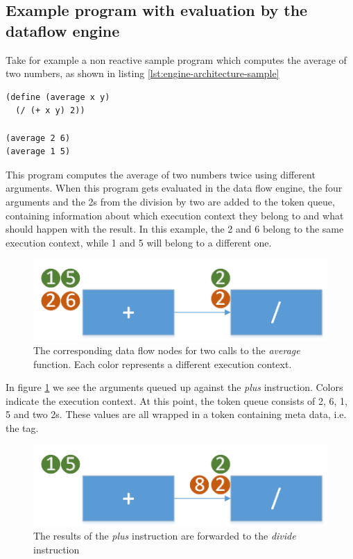 \subsection{Example program with evaluation by the dataflow engine}

Take for example a non reactive sample program which computes the average of two numbers, as shown in listing \ref{lst:engine-architecture-sample}

\begin{lstlisting}[caption={Computing the average of two numbers},captionpos=b,label={lst:engine-architecture-sample},language=FrDataFlow]
(define (average x y)
  (/ (+ x y) 2))
  
(average 2 6)
(average 1 5)
\end{lstlisting}

This program computes the average of two numbers twice using different arguments. When this program gets evaluated in the data flow engine, the four arguments and the 2s from the division by two are added to the token queue, containing information about which execution context they belong to and what should happen with the result. 
In this example, the 2 and 6 belong to the same execution context, while 1 and 5 will belong to a different one. 

\begin{figure}[h!]
	\centering
	\includegraphics[scale=0.8]{images/Engine-Architecture-1.png}
	\caption{The corresponding data flow nodes for two calls to the \textit{average} function. Each color represents a different execution context.}
	\label{fig:engine-architecture-1}
\end{figure}

In figure \ref{fig:engine-architecture-1} we see the arguments queued up against the \textit{plus} instruction. Colors indicate the execution context. At this point, the token queue consists of 2, 6, 1, 5 and two 2s. These values are all wrapped in a token containing meta data, i.e. the tag. 

\begin{figure}[h!]
	\centering
	\includegraphics[scale=0.8]{images/Engine-Architecture-2.png}
	\caption{The results of the \textit{plus} instruction are forwarded to the \textit{divide} instruction}
	\label{fig:engine-architecture-2}
\end{figure}

